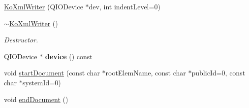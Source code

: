 \begin{CompactItemize}
\item 
\hyperlink{classKoXmlWriter_533f9617e577fd34b4a4c7ad9fe23255}{KoXmlWriter} (QIODevice $\ast$dev, int indentLevel=0)
\item 
\hypertarget{classKoXmlWriter_0af2dc9077618677116a0fe22b6f8951}{
\hyperlink{classKoXmlWriter_0af2dc9077618677116a0fe22b6f8951}{$\sim$KoXmlWriter} ()}
\label{classKoXmlWriter_0af2dc9077618677116a0fe22b6f8951}

\begin{CompactList}\small\item\em Destructor. \item\end{CompactList}\item 
\hypertarget{classKoXmlWriter_43b736aa4bfa08765e0648d6fb5758ed}{
QIODevice $\ast$ \textbf{device} () const }
\label{classKoXmlWriter_43b736aa4bfa08765e0648d6fb5758ed}

\item 
void \hyperlink{classKoXmlWriter_867932c8d3bbecd712572230cb0b64cd}{startDocument} (const char $\ast$rootElemName, const char $\ast$publicId=0, const char $\ast$systemId=0)
\item 
\hypertarget{classKoXmlWriter_5ab08b557107287ecc4e1f6528a79843}{
void \hyperlink{classKoXmlWriter_5ab08b557107287ecc4e1f6528a79843}{endDocument} ()}
\label{classKoXmlWriter_5ab08b557107287ecc4e1f6528a79843}


\end{CompactItemize}
